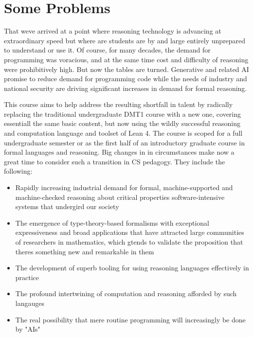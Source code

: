 \documentclass{book}
\providecommand{\tightlist}{%
  \setlength{\itemsep}{0pt}\setlength{\parskip}{0pt}}
\begin{document}
\hypertarget{book__pandoc__debug__src__preface.md__some-problems}{%
\section*{Some Problems}\label{book__pandoc__debug__src__preface.md__some-problems}}

That we\textquotesingle ve arrived at a point where reasoning technology is advancing at extraordinary speed but where are students are by and large entirely unprepared to understand or use it. Of course, for many decades, the demand for programming was voracious, and at the same time cost and difficulty of reasoning were prohibitively high. But now the tables are turned. Generative and related AI promise to reduce demand for programming code while the needs of industry and national security are driving significant increases in demand for formal reasoning.

This course aims to help address the resulting shortfall in talent by radically replacing the traditional undergraduate DMT1 course with a new one, covering essentiall the same basic content, but now using the wildly successful reasoning and computation language and toolset of Lean 4. The course is scoped for a full undergraduate semester or as the first half of an introductory graduate course in formal languages and reasoning. Big changes in in circumstances make now a great time to consider such a transition in CS pedagogy. They include the following:

\begin{itemize}
\tightlist
\item
  Rapidly increasing industrial demand for formal, machine-supported and machine-checked reasoning about critical properties software-intensive systems that undergird our society
\item
  The emergence of type-theory-based formalisms with exceptional expressiveness and broad applications that have attracted large communities of researchers in mathematics, which gtends to validate the proposition that there\textquotesingle s something new and remarkable in them
\item
  The development of superb tooling for using reasoning languages effectively in practice
\item
  The profound intertwining of computation and reasoning afforded by such langauges
\item
  The real possibility that mere routine programming will increasingly be done by "AIs"
\end{itemize}
\end{document}
